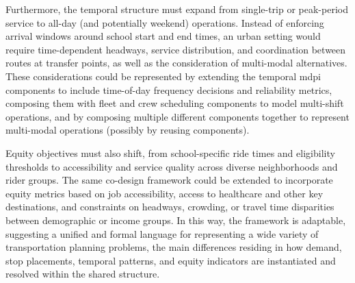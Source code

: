 Furthermore, the temporal structure must expand from single-trip or peak-period service to all-day (and potentially weekend) operations. Instead of enforcing arrival windows around school start and end times, an urban setting would require time-dependent headways, service distribution, and coordination between routes at transfer points, as well as the consideration of multi-modal alternatives. These considerations could be represented by extending the temporal \gls{mdpi} components to include time-of-day frequency decisions and reliability metrics, composing them with fleet and crew scheduling components to model multi-shift operations, and by composing multiple different components together to represent multi-modal operations (possibly by reusing components).

Equity objectives must also shift, from school-specific ride times and eligibility thresholds to accessibility and service quality across diverse neighborhoods and rider groups. The same co-design framework could be extended to incorporate equity metrics based on job accessibility, access to healthcare and other key destinations, and constraints on headways, crowding, or travel time disparities between demographic or income groups. In this way, the framework is adaptable, suggesting a unified and formal language for representing a wide variety of transportation planning problems, the main differences residing in how demand, stop placements, temporal patterns, and equity indicators are instantiated and resolved within the shared structure.